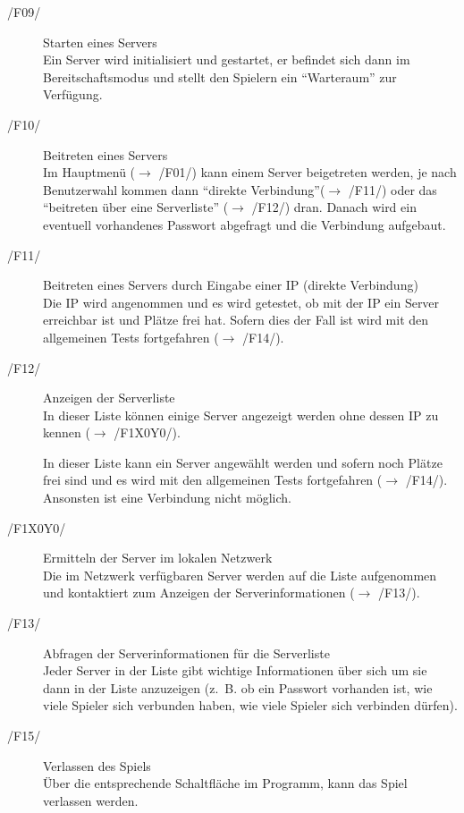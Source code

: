 \documentclass[a4paper,10pt]{article}
\begin{document}
\begin{description}
\item[/F09/] Starten eines Servers \\
Ein Server wird initialisiert und gestartet, er befindet sich dann im Bereitschaftsmodus und stellt den Spielern ein ``Warteraum'' zur Verfügung.

\item[/F10/] Beitreten eines Servers \\
Im Hauptmenü ($\rightarrow$ /F01/) kann einem Server beigetreten werden, je nach Benutzerwahl kommen dann ``direkte Verbindung''($\rightarrow$ /F11/) oder das ``beitreten über eine Serverliste'' ($\rightarrow$ /F12/) dran. Danach wird ein eventuell vorhandenes Passwort abgefragt und die Verbindung aufgebaut.

\item[/F11/] Beitreten eines Servers durch Eingabe einer IP (direkte Verbindung) \\
Die IP wird angenommen und es wird getestet, ob mit der IP ein Server erreichbar ist und Plätze frei hat. Sofern dies der Fall ist wird mit den allgemeinen Tests fortgefahren ($\rightarrow$ /F14/).

\item[/F12/] Anzeigen der Serverliste \\
In dieser Liste können einige Server angezeigt werden ohne dessen IP zu kennen ($\rightarrow$ /F1X0Y0/).

In dieser Liste kann ein Server angewählt werden und sofern noch Plätze frei sind und es wird mit den allgemeinen Tests fortgefahren ($\rightarrow$ /F14/). Ansonsten ist eine Verbindung nicht möglich.
\item[/F1X0Y0/] Ermitteln der Server im lokalen Netzwerk \\
Die im Netzwerk verfügbaren Server werden auf die Liste aufgenommen und kontaktiert zum Anzeigen der Serverinformationen ($\rightarrow$ /F13/).
\item[/F13/] Abfragen der Serverinformationen für die Serverliste \\
Jeder Server in der Liste gibt wichtige Informationen über sich um sie dann in der Liste anzuzeigen (z.~B. ob ein Passwort vorhanden ist, wie viele Spieler sich verbunden haben, wie viele Spieler sich verbinden dürfen).
\item[/F15/] Verlassen des Spiels \\
Über die entsprechende Schaltfläche im Programm, kann das Spiel verlassen werden.
\end{description}
\end{document}
